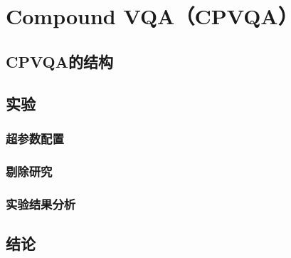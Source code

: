 \chapter{Compound VQA（CPVQA）}

\section{CPVQA的结构}

\section{实验}
\subsection{超参数配置}
\subsection{剔除研究}
\subsection{实验结果分析}

\section{结论}

